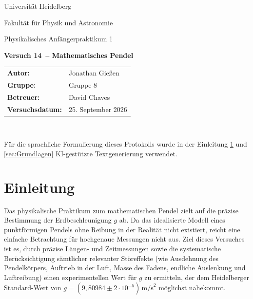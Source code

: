 \documentclass[12pt,a4paper,titlepage]{scrartcl}
\numberwithin{equation}{section}
\numberwithin{table}{section}
\numberwithin{figure}{section}
\newcommand{\versuch}{Versuch 14}
\newcommand{\titel}{Mathematisches Pendel}
\newcommand{\praktikum}{Physikalisches Anfängerpraktikum 1}
\newcommand{\autor}{Jonathan Gießen}
\newcommand{\gruppe}{Gruppe 8}
\newcommand{\datum}{25. September 2026}
\newcommand{\betreuer}{David Chaves}
\begin{document}
\pagestyle{scrheadings}

\begin{titlepage}



    \centering
    \vspace*{4cm}
    {\large Universität Heidelberg\par}
    {\small Fakultät für Physik und Astronomie\par}
    {\Large \praktikum\par}
    \vspace{0.8cm}
    {\LARGE \bfseries \versuch\ -- \titel\par}
    \vspace{1.5cm}

    \begin{tabular}{ll}
        \textbf{Autor:} & \autor\\
        \textbf{Gruppe:} & \gruppe\\
        \textbf{Betreuer:} & \betreuer\\
        \textbf{Versuchsdatum:} & \datum\\
    \end{tabular}

    \vfill
    \hrulefill\
\end{titlepage}

\tableofcontents

\bigskip
\begin{tcolorbox}[colback=gray!5,colframe=gray!60,boxrule=0.8pt,arc=0.01mm,title=KI-Hinweis]
    Für die sprachliche Formulierung dieses Protokolls wurde in der Einleitung \ref{sec:Einleitung} und \ref{sec:Grundlagen} KI-gestützte Textgenerierung verwendet. 
\end{tcolorbox}

\clearpage


\section{Einleitung}\label{sec:Einleitung}
Das physikalische Praktikum zum mathematischen Pendel zielt auf die präzise Bestimmung der Erdbeschleunigung $g$ ab. Da das idealisierte Modell eines punktförmigen Pendels ohne Reibung in der Realität nicht existiert, reicht eine einfache Betrachtung für hochgenaue Messungen nicht aus. Ziel dieses Versuches ist es, durch präzise Längen- und Zeitmessungen sowie die systematische Berücksichtigung sämtlicher relevanter Störeffekte (wie Ausdehnung des Pendelkörpers, Auftrieb in der Luft, Masse des Fadens, endliche Auslenkung und Luftreibung) einen experimentellen Wert für $g$ zu ermitteln, der dem Heidelberger Standard-Wert von $g = (9,80984 \pm 2 \cdot 10^{-5}) \, \text{m/s}^2$ möglichst nahekommt. 
\end{document}
